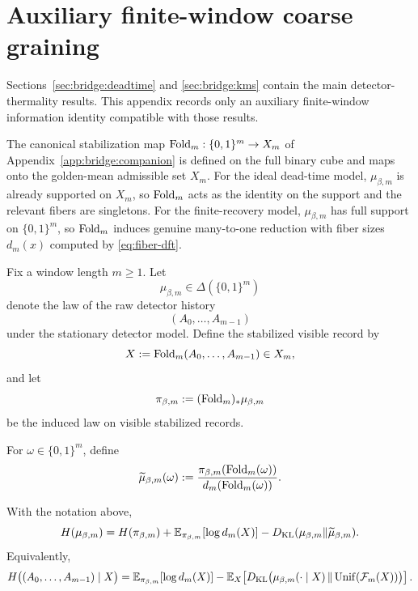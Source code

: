 \section{Auxiliary finite-window coarse graining}%
\makeatletter\edef{}\makeatother\label{app:bridge:microhistory}

Sections~\ref{sec:bridge:deadtime} and \ref{sec:bridge:kms} contain the main detector-thermality results. This appendix records only an auxiliary finite-window information identity compatible with those results.

\begin{assumption}\label{ass:stabilization-applicability}
The canonical stabilization map $\mathrm{Fold}_m:\{0,1\}^m\to X_m$ of Appendix~\ref{app:bridge:companion} is defined on the full binary cube and maps onto the golden-mean admissible set $X_m$. For the ideal dead-time model, $\mu_{\beta,m}$ is already supported on $X_m$, so $\mathrm{Fold}_m$ acts as the identity on the support and the relevant fibers are singletons. For the finite-recovery model, $\mu_{\beta,m}$ has full support on $\{0,1\}^m$, so $\mathrm{Fold}_m$ induces genuine many-to-one reduction with fiber sizes $d_m(x)$ computed by \eqref{eq:fiber-dft}.
\end{assumption}

\begin{definition}\label{def:bridge-visible-record}
Fix a window length $m\ge 1$. Let
\[
\mu_{\beta,m}\in\Delta(\{0,1\}^m)
\]
denote the law of the raw detector history
\[
(A_0,\dots,A_{m-1})
\]
under the stationary detector model. Define the stabilized visible record by
\[
X:=\mathrm{Fold}_m(A_0,\dots,A_{m-1})\in X_m,
\]
and let
\[
\pi_{\beta,m}:=(\mathrm{Fold}_m)_*\mu_{\beta,m}
\]
be the induced law on visible stabilized records.
\end{definition}

\begin{definition}\label{def:bridge-fiber-lift}
For $\omega\in\{0,1\}^m$, define
\begin{equation}\label{eq:bridge-fiber-lift}
\widetilde\mu_{\beta,m}(\omega)
:=
\frac{\pi_{\beta,m}(\mathrm{Fold}_m(\omega))}{d_m(\mathrm{Fold}_m(\omega))}.
\end{equation}
\end{definition}

\begin{theorem}\label{thm:bridge-ledger}
With the notation above,
\begin{equation}\label{eq:bridge-ledger}
H(\mu_{\beta,m})
=
H(\pi_{\beta,m})
+
\mathbb{E}_{\pi_{\beta,m}}[\log d_m(X)]
-
D_{\mathrm{KL}}(\mu_{\beta,m}\Vert \widetilde\mu_{\beta,m}).
\end{equation}
Equivalently,
\begin{equation}\label{eq:bridge-conditional-ledger}
H\bigl((A_0,\dots,A_{m-1})\mid X\bigr)
=
\mathbb{E}_{\pi_{\beta,m}}[\log d_m(X)]
-
\mathbb{E}_X\!\left[
D_{\mathrm{KL}}\bigl(
\mu_{\beta,m}(\cdot\mid X)\,\Vert\,\mathrm{Unif}(\mathcal F_m(X))
\bigr)
\right].
\end{equation}
\end{theorem}

